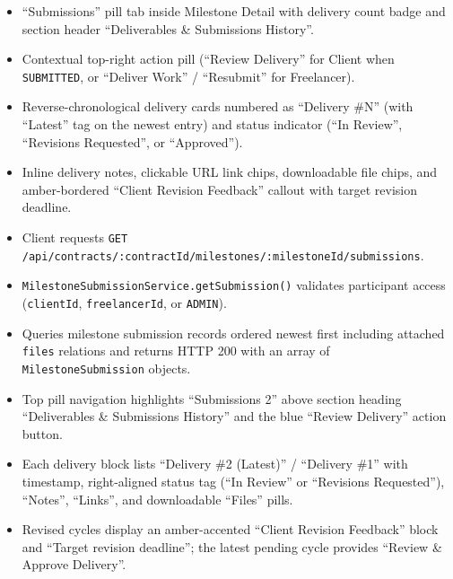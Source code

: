 \begin{itemize}[leftmargin=1.6em,topsep=3pt,itemsep=2pt,parsep=0pt,label=$\bullet$]
      \item ``Submissions'' pill tab inside Milestone Detail with delivery count badge and section header ``Deliverables \& Submissions History''.
      \item Contextual top-right action pill (``Review Delivery'' for Client when \texttt{SUBMITTED}, or ``Deliver Work'' / ``Resubmit'' for Freelancer).
      \item Reverse-chronological delivery cards numbered as ``Delivery \#N'' (with ``Latest'' tag on the newest entry) and status indicator (``In Review'', ``Revisions Requested'', or ``Approved'').
      \item Inline delivery notes, clickable URL link chips, downloadable file chips, and amber-bordered ``Client Revision Feedback'' callout with target revision deadline.
\end{itemize}

\begin{itemize}[leftmargin=1.6em,topsep=3pt,itemsep=2pt,parsep=0pt,label=$\bullet$]
      \item Client requests \texttt{GET /\allowbreak{}api/\allowbreak{}contracts/\allowbreak{}:\allowbreak{}contractId/\allowbreak{}milestones/\allowbreak{}:\allowbreak{}milestoneId/\allowbreak{}submissions}.
      \item \texttt{Milestone\allowbreak{}Submission\allowbreak{}Service.\allowbreak{}getSubmission()} validates participant access (\texttt{clientId}, \texttt{freelancerId}, or \texttt{ADMIN}).
      \item Queries milestone submission records ordered newest first including attached \texttt{files} relations and returns HTTP 200 with an array of \texttt{MilestoneSubmission} objects.
\end{itemize}

\begin{itemize}[leftmargin=1.6em,topsep=3pt,itemsep=2pt,parsep=0pt,label=$\bullet$]
      \item Top pill navigation highlights ``Submissions 2'' above section heading ``Deliverables \& Submissions History'' and the blue ``Review Delivery'' action button.
      \item Each delivery block lists ``Delivery \#2 (Latest)'' / ``Delivery \#1'' with timestamp, right-aligned status tag (``In Review'' or ``Revisions Requested''), ``Notes'', ``Links'', and downloadable ``Files'' pills.
      \item Revised cycles display an amber-accented ``Client Revision Feedback'' block and ``Target revision deadline''; the latest pending cycle provides ``Review \& Approve Delivery''.
\end{itemize}


